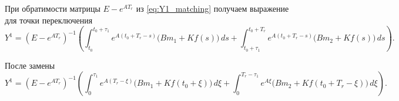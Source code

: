 \documentclass[12pt,a4paper]{article}
\theoremstyle{bigplain}
\theoremstyle{plain}
\begin{document}
\noindent При обратимости матрицы $E-e^{AT_r}$ из
\eqref{eq:Y1_matching} получаем выражение для точки переключения
\begin{equation*}
Y^{1}
=
(E-e^{AT_r})^{-1}
\left(
\int_{t_0}^{t_0+\tau_1}
e^{A(t_0+T_r-s)}
\bigl(Bm_1+Kf(s)\bigr)\,ds
+
\int_{t_0+\tau_1}^{t_0+T_r}
e^{A(t_0+T_r-s)}
\bigl(Bm_2+Kf(s)\bigr)\,ds
\right).
\end{equation*}

\noindent После замены
\begin{equation*}
Y^{1}
=
(E-e^{AT_r})^{-1}
\left(
\int_{0}^{\tau_1}
e^{A(T_r-\xi)}
\bigl(Bm_1+Kf(t_0+\xi)\bigr)\,d\xi
+
\int_{0}^{T_r-\tau_1}
e^{A\xi}
\bigl(Bm_2+Kf(t_0+T_r-\xi)\bigr)\,d\xi
\right).
\end{equation*}

\newpage
{}
\\
\end{document}

